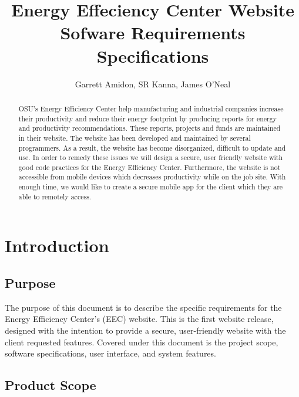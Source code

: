 \documentclass[letterpaper,10pt,titlepage,journal,compsoc,draftclsnofoot,onecolumn]{IEEEtran}
\title{Energy Effeciency Center Website \\
	\large Sofware Requirements Specifications}
\author{Garrett Amidon, SR Kanna, James O'Neal}
\begin{document}
\begin{titlingpage}
    \maketitle
	\centering{}
    \begin{abstract}
        
        OSU’s Energy Efficiency Center help manufacturing and industrial companies increase their productivity and reduce their energy footprint by producing reports for energy and productivity recommendations. These reports, projects and funds are maintained in their website. The website has been developed and maintained by several programmers. As a result, the website has become disorganized, difficult to update and use. In order to remedy these issues we will design a secure, user friendly website with good code practices for the Energy Efficiency Center. 	Furthermore, the website is not accessible from mobile devices which decreases productivity while on the job site. With enough time, we would like to create a secure mobile app for the client which they are able to remotely access.
        
    \end{abstract}
\end{titlingpage}

\newpage

\tableofcontents{}

\newpage

\section{Introduction}

\subsection{Purpose}

The purpose of this document is to describe the specific requirements for the Energy Efficiency Center’s (EEC) website. This is the first website release, designed with the intention to provide a secure, user-friendly website with the client requested features. Covered under this document is the project scope, software specifications, user interface, and system features.

\subsection{Product Scope}
\end{document}

